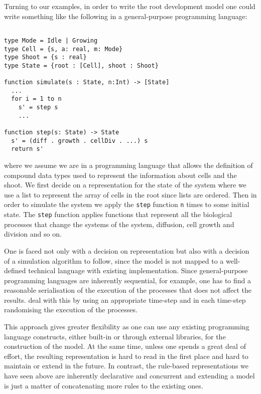 Turning to our examples, in order to write the root development model one could
write something like the following in a general-purpose programming language:

\begin{BVerbatim}
  
type Mode = Idle | Growing
type Cell = {s, a: real, m: Mode}
type Shoot = {s : real}
type State = {root : [Cell], shoot : Shoot}

function simulate(s : State, n:Int) -> [State]
  ...
  for i = 1 to n
    s' = step s
    ...

function step(s: State) -> State
  s' = (diff . growth . cellDiv . ...) s
  return s'
\end{BVerbatim}

where we assume we are in a programming language that allows the definition of
compound data types used to represent the information about cells and the
shoot. We first decide on a representation for the state of the system where we
use a list to represent the array of cells in the root since lists are
ordered. Then in order to simulate the system we apply the \texttt{step}
function \texttt{n} times to some initial state. The \texttt{step} function
applies functions that represent all the biological processes that change the
systems of the system, diffusion, cell growth and division and so on.

One is faced not only with a decision on representation but also with a decision
of a simulation algorithm to follow, since the model is not mapped to a
well-defined technical language with existing implementation. Since
general-purpose programming languages are inherently sequential, for example,
one has to find a reasonable serialisation of the execution of the processes
that does not affect the results. \citet{karr_whole-cell_2012} deal with this by
using an appropriate time-step and in each time-step randomising the execution
of the processes.

This approach gives greater flexibility as one can use any existing programming
language constructs, either built-in or through external libraries, for the
construction of the model. At the same time, unless one spends a great deal of
effort, the resulting representation is hard to read in the first place and hard
to maintain or extend in the future. In contrast, the rule-based representations
we have seen above are inherently declarative and concurrent and extending a
model is just a matter of concatenating more rules to the existing ones.

